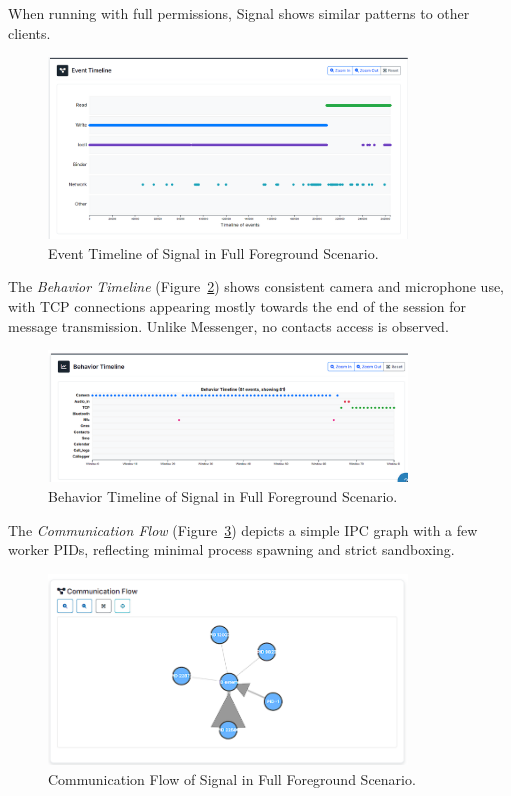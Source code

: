 \documentclass[a4paper,12pt]{report}
\begin{document}
When running with full permissions, Signal shows similar patterns to other clients.

\begin{figure}[H]
    \centering
    \includegraphics[width=0.85\textwidth]{signal-full-events.png}
    \caption{Event Timeline of Signal in Full Foreground Scenario.}
    \label{fig:signal-full-events}
\end{figure}

The \textit{Behavior Timeline} (Figure~\ref{fig:signal-full-behav}) shows consistent camera and microphone use, with TCP connections appearing mostly towards the end of the session for message transmission. Unlike Messenger, no contacts access is observed.

\begin{figure}[H]
    \centering
    \includegraphics[width=0.85\textwidth]{signal-full-behav.png}
    \caption{Behavior Timeline of Signal in Full Foreground Scenario.}
    \label{fig:signal-full-behav}
\end{figure}

The \textit{Communication Flow} (Figure~\ref{fig:signal-full-flow}) depicts a simple IPC graph with a few worker PIDs, reflecting minimal process spawning and strict sandboxing.

\begin{figure}[H]
    \centering
    \includegraphics[width=0.85\textwidth]{signal-full-flow.png}
    \caption{Communication Flow of Signal in Full Foreground Scenario.}
    \label{fig:signal-full-flow}
\end{figure}
\end{document}
